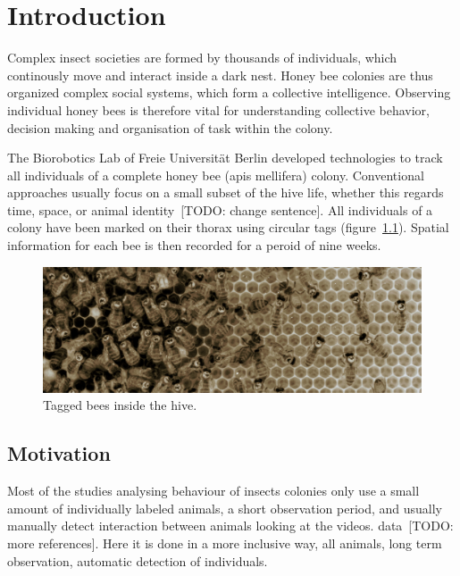 \chapter{Introduction}
\label{ch:intro}

Complex insect societies are formed by thousands of individuals, which continously move and interact inside a dark nest. Honey bee colonies are thus organized complex social systems, which form a collective intelligence. Observing individual honey bees is therefore vital for understanding collective behavior, decision making and organisation of task within the colony.

The Biorobotics Lab of Freie Universität Berlin developed technologies to track all individuals of a complete honey bee (apis mellifera) colony. Conventional approaches usually focus on a small subset of the hive life, whether this regards time, space, or animal identity~\cite{wario2015automatic}[TODO: change sentence]. All individuals of a colony have been marked on their thorax using circular tags (figure~\ref{fig:markers}). Spatial information for each bee is then recorded for a peroid of nine weeks.


\begin{figure}[htb]
	\centering
	\includegraphics[width=1.0\textwidth]{Figures/markers}
	\caption{Tagged bees inside the hive.}
	\label{fig:markers}
\end{figure}

\section{Motivation}

Most of the studies analysing behaviour of insects colonies only use a small amount of individually labeled animals, a short observation period, and usually manually detect interaction between animals looking at the videos. data~\cite{quevillon2015social}[TODO: more references]. Here it is done in a more inclusive way, all animals, long term observation, automatic detection of individuals.


